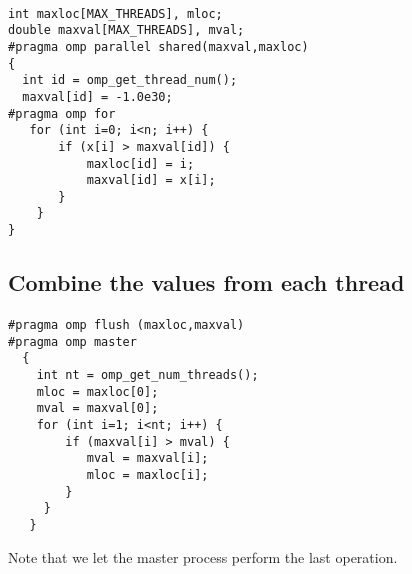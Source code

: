 \documentclass[%
oneside,                 %
final,                   %
10pt]{article}
\begin{document}
\paragraph{}















\begin{verbatim}
int maxloc[MAX_THREADS], mloc;
double maxval[MAX_THREADS], mval; 
#pragma omp parallel shared(maxval,maxloc)
{
  int id = omp_get_thread_num(); 
  maxval[id] = -1.0e30;
#pragma omp for
   for (int i=0; i<n; i++) {
       if (x[i] > maxval[id]) { 
           maxloc[id] = i;
           maxval[id] = x[i]; 
       }
    }
}

\end{verbatim}



\subsection*{Combine the values from each thread}

\paragraph{}














\begin{verbatim}
#pragma omp flush (maxloc,maxval)
#pragma omp master
  {
    int nt = omp_get_num_threads(); 
    mloc = maxloc[0]; 
    mval = maxval[0]; 
    for (int i=1; i<nt; i++) {
        if (maxval[i] > mval) { 
           mval = maxval[i]; 
           mloc = maxloc[i];
        } 
     }
   }

\end{verbatim}

Note that we let the master process perform the last operation.
\end{document}
